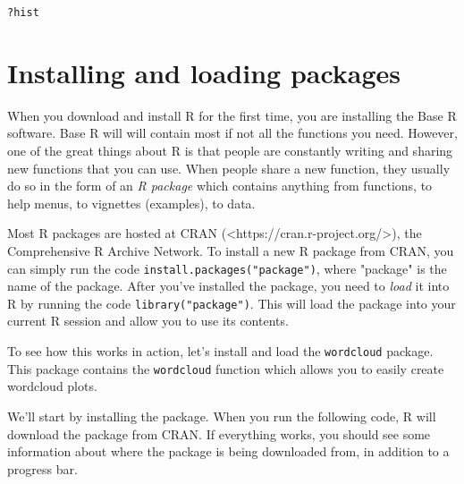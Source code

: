 \documentclass{tufte-book}\usepackage[]{graphicx}\usepackage[]{color}
\makeatletter
\newcommand{\hlopt}[1]{\textcolor[rgb]{0,0,0}{#1}}%
\newcommand{\hlstd}[1]{\textcolor[rgb]{0.345,0.345,0.345}{#1}}%
\newenvironment{kframe}{%
 \def\at@end@of@kframe{}%
 \ifinner\ifhmode%
  \def\at@end@of@kframe{\end{minipage}}%
  \begin{minipage}{\columnwidth}%
 \fi\fi%
 \def\FrameCommand##1{\hskip\@totalleftmargin \hskip-\fboxsep
 \colorbox{shadecolor}{##1}\hskip-\fboxsep
     \hskip-\linewidth \hskip-\@totalleftmargin \hskip\columnwidth}%
 \MakeFramed {\advance\hsize-\width
   \@totalleftmargin\z@ \linewidth\hsize
   \@setminipage}}%
 {\par\unskip\endMakeFramed%
 \at@end@of@kframe}
\newenvironment{knitrout}{}{} %
\makeatother
\begin{document}

\begin{footnotesize}
\begin{knitrout}
\color{fgcolor}\begin{kframe}
\begin{alltt}
\hlopt{?}\hlstd{hist}
\end{alltt}
\end{kframe}
\end{knitrout}
\end{footnotesize}


\section{Installing and loading packages}

When you download and install R for the first time, you are installing the Base R software. Base R will will contain most if not all the functions you need. However, one of the great things about R is that people are constantly writing and sharing new functions that you can use. When people share a new function, they usually do so in the form of an \textit{R package} which contains anything from functions, to help menus, to vignettes (examples), to data.

Most R packages are hosted at CRAN (<https://cran.r-project.org/>), the Comprehensive R Archive Network. To install a new R package from CRAN, you can simply run the code \texttt{install.packages("package")}, where "package" is the name of the package. After you've installed the package, you need to \textit{load} it into R by running the code \texttt{library("package")}. This will load the package into your current R session and allow you to use its contents.

To see how this works in action, let's install and load the \texttt{wordcloud} package. This package contains the \texttt{wordcloud} function which allows you to easily create wordcloud plots.

We'll start by installing the package. When you run the following code, R will download the package from CRAN. If everything works, you should see some information about where the package is being downloaded from, in addition to a progress bar.
\end{document}
